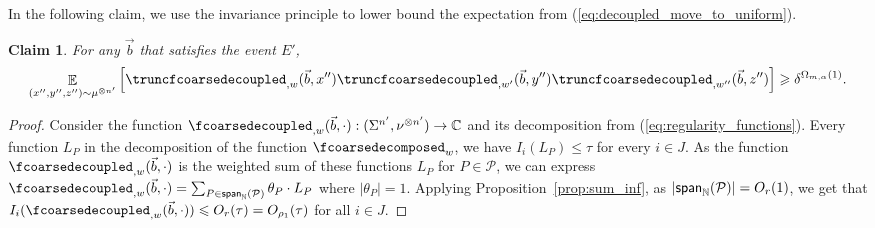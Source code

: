 \documentclass[11pt]{article}
\newtheorem{claim}[thm]{Claim}
\newcommand\card[1]{\left| {#1} \right|}
\newcommand\Expect[2]{{\mathop{\mathbb{E}}_{#1}\left[ {#2} \right]}}
\newcommand\spn{{\sf span}_{\mathbb{N}}}
\renewcommand\geq{\geqslant}
\renewcommand\leq{\leqslant}
\newcommand{\V}[1]{{#1}}
\begin{document}
In the following claim, we use the invariance principle to lower bound the expectation from (\ref{eq:decoupled_move_to_uniform}).
\begin{claim}
\label{claim:invariance_lb}
  For any $\vec{b}$ that satisfies the event $E'$, 
$$\Expect{(\V x'', \V y'', \V z'')\sim\mu^{\otimes n'}}{\truncfcoarsedecoupled_{,\V w}(\vec{b}, \V x'')\truncfcoarsedecoupled_{,\V w'}(\vec{b}, \V y'') \truncfcoarsedecoupled_{,\V w''}(\vec{b}, \V z'')}\geq \delta^{\Omega_{m,\alpha}(1)}.$$
\end{claim}
\begin{proof}
   Consider the function $\fcoarsedecoupled_{,\V w}(\vec{b}, \cdot) : (\Sigma^{n'}, \nu^{\otimes n'}) \rightarrow \mathbb{C}$ and its decomposition from (\ref{eq:regularity_functions}). Every function $L_{P}$ in the decomposition of the function $\fcoarsedecomposed_{w}$, we have $I_i(L_{P}) \leq \tau$ for every $i\in J$.  As the function $\fcoarsedecoupled_{,\V w}(\vec{b}, \cdot)$ is the weighted sum of these functions $L_{P}$ for $P\in \mathcal{P}$, we can express $\fcoarsedecoupled_{,\V w}(\vec{b}, \cdot) = \sum_{P\in \spn(\mathcal{P})} \theta_P \cdot L_P$ where $|\theta_P| = 1$. Applying Proposition~\ref{prop:sum_inf}, as $\card{\spn(\mathcal{P})} = O_r(1)$, we get that $I_i(\fcoarsedecoupled_{,\V w}(\vec{b},\cdot))\leq  O_{r}(\tau) = O_{\rho_1}(\tau)$ for all $i\in J$.
   


\end{proof}
\end{document}
